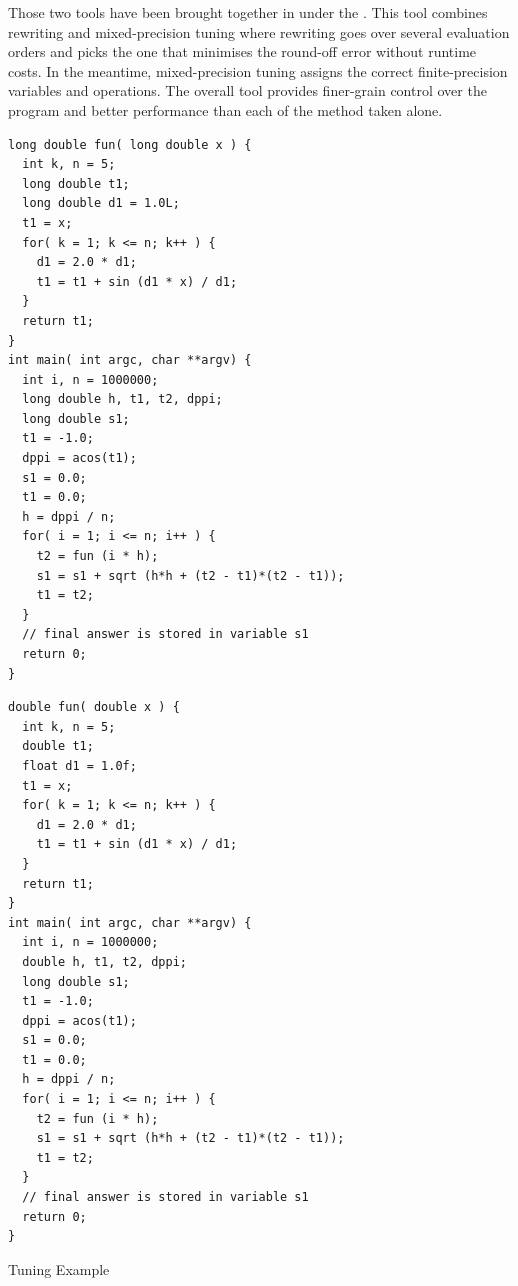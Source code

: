Those two tools have been brought together in \cite{Darulova2018} under the . This tool combines rewriting and mixed-precision tuning where rewriting goes over several evaluation orders and picks the one that minimises the round-off error without runtime costs. In the meantime, mixed-precision tuning assigns the correct finite-precision variables and operations. The overall tool provides finer-grain control over the program and better performance than each of the method taken alone.
\begin{mylisting}[htbp]
\centering
\begin{minipage}{.48\textwidth}
\begin{lstlisting}[style=CInputStyle]
long double fun( long double x ) {
  int k, n = 5;
  long double t1;
  long double d1 = 1.0L;
  t1 = x;
  for( k = 1; k <= n; k++ ) {
    d1 = 2.0 * d1;
    t1 = t1 + sin (d1 * x) / d1;
  }
  return t1;
}
int main( int argc, char **argv) {
  int i, n = 1000000;
  long double h, t1, t2, dppi;
  long double s1;
  t1 = -1.0;
  dppi = acos(t1);
  s1 = 0.0;
  t1 = 0.0;
  h = dppi / n;
  for( i = 1; i <= n; i++ ) {
    t2 = fun (i * h);
    s1 = s1 + sqrt (h*h + (t2 - t1)*(t2 - t1));
    t1 = t2;
  }
  // final answer is stored in variable s1
  return 0;
}
\end{lstlisting}
\end{minipage}
\hfill
\begin{minipage}{.48\textwidth}
\begin{lstlisting}[style=CInputStyle]
double fun( double x ) {
  int k, n = 5;
  double t1;
  float d1 = 1.0f;
  t1 = x;
  for( k = 1; k <= n; k++ ) {
    d1 = 2.0 * d1;
    t1 = t1 + sin (d1 * x) / d1;
  }
  return t1;
}
int main( int argc, char **argv) {
  int i, n = 1000000;
  double h, t1, t2, dppi;
  long double s1;
  t1 = -1.0;
  dppi = acos(t1);
  s1 = 0.0;
  t1 = 0.0;
  h = dppi / n;
  for( i = 1; i <= n; i++ ) {
    t2 = fun (i * h);
    s1 = s1 + sqrt (h*h + (t2 - t1)*(t2 - t1));
    t1 = t2;
  }
  // final answer is stored in variable s1
  return 0;
}
\end{lstlisting}
\end{minipage}
\caption[Tuning]{Tuning Example \cite{Rubio2013}}
	\label{fig:Tuning}
\end{mylisting}

